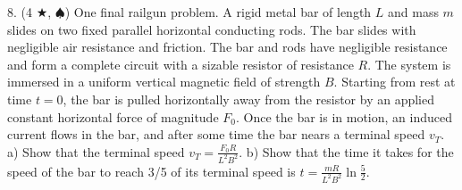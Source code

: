 8. (4 $\bigstar$, $\spadesuit$) One final railgun problem. A rigid metal bar of length $L$ and mass $m$ slides on two fixed parallel horizontal conducting rods. The bar slides with negligible air resistance and friction. The bar and rods have negligible resistance and form a complete circuit with a sizable resistor of resistance $R$. The system is immersed in a uniform vertical magnetic field of strength $B$. Starting from rest at time $t=0$, the bar is pulled horizontally away from the resistor by an applied constant horizontal force of magnitude $F_0$. Once the bar is in motion, an induced current flows in the bar, and after some time the bar nears a terminal speed $v_T$. a) Show that the terminal speed $v_T = \frac{F_0R}{L^2B^2}$. b) Show that the time it takes for the speed of the bar to reach 3/5 of its terminal speed is $t = \frac{mR}{L^2B^2} \ln \frac{5}{2}$.

\pagebreak